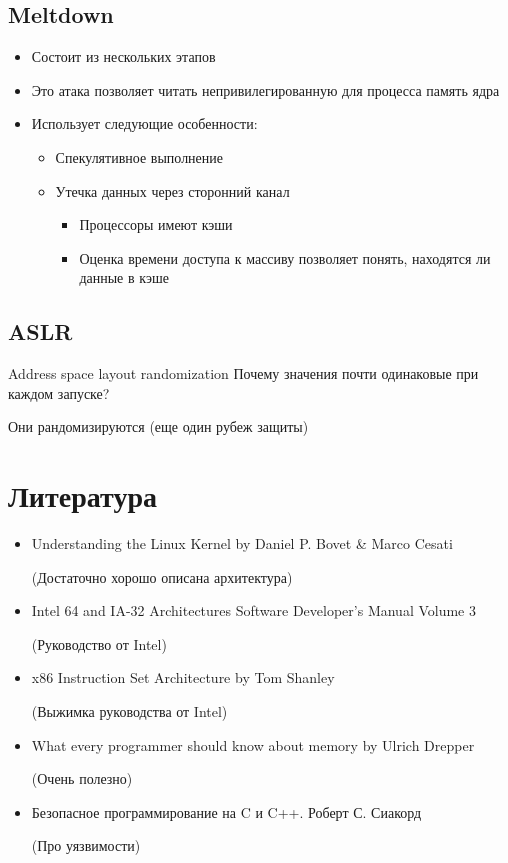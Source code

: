\documentclass[../../lectures.tex]{subfiles}
\begin{document}
\subsection{Meltdown}
\begin{itemize}
    \item Состоит из нескольких этапов
    \item Это атака позволяет читать непривилегированную для процесса память ядра
    \item Использует следующие особенности:
          \begin{itemize}
              \item Спекулятивное выполнение
              \item Утечка данных через сторонний канал
                  \begin{itemize}
                      \item Процессоры имеют кэши
                      \item Оценка времени доступа к массиву позволяет понять, находятся ли данные в кэше
                  \end{itemize}
          \end{itemize}
\end{itemize}

\subsection{ASLR}
Address space layout randomization
Почему значения почти одинаковые при каждом запуске?

Они рандомизируются (еще один рубеж защиты)

\section{Литература}
\begin{itemize}
    \item Understanding the Linux Kernel by Daniel P. Bovet \& Marco Cesati

          (Достаточно хорошо описана архитектура)
    \item Intel 64 and IA-32 Architectures Software Developer's Manual Volume 3

          (Руководство от Intel)
    \item x86 Instruction Set Architecture by Tom Shanley

          (Выжимка руководства от Intel)
    \item What every programmer should know about memory by Ulrich Drepper

          (Очень полезно)
    \item Безопасное программирование на C и C++. Роберт С. Сиакорд

          (Про уязвимости)
\end{itemize}
\end{document}
